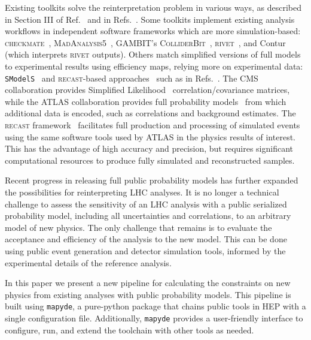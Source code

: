 \documentclass{article}
\newcommand{\mapyde}{\texttt{mapyde}}
\newcommand{\recast}{\textsc{recast}}
\begin{document}
Existing toolkits solve the reinterpretation problem in various ways, as described in Section III of Ref.~\cite{LHCReinterpretationForum:2020xtr} and in Refs.~\cite{Cranmer:2021urp,Bailey:2022tdz}.  Some toolkits implement existing analysis workflows in independent software frameworks which are more simulation-based: \textsc{checkmate}~\cite{Dercks:2016npn}, \textsc{MadAnalysis5}~\cite{Conte:2018vmg,Araz:2020lnp,Dumont:2014tja}, \textsc{GAMBIT}'s \textsc{ColliderBit}~\cite{GAMBIT:2017yxo,Kvellestad:2019vxm,GAMBIT:2018gjo,zenodo:gambit}, \textsc{rivet}~\cite{Bierlich:2019rhm,Bierlich:2020wms}, and Contur~\cite{Buckley:2021neu} (which interprets \textsc{rivet} outputs).  Others match simplified versions of full models to experimental results using efficiency maps, relying more on experimental data: \texttt{SModelS}~\cite{Alguero:2021dig} and \recast-based approaches~\cite{Cranmer:2010hk} such as in Refs.~\cite{zenodo:LHCreinterpretation,llpRepo,RECAST1,RECAST2,RECAST3}.  The CMS collaboration provides Simplified Likelihood~\cite{CMS-NOTE-2017-001} correlation/covariance matrices, while the ATLAS collaboration provides full probability models~\cite{ATL-PHYS-PUB-2019-029} from which additional data is encoded, such as correlations and background estimates. The \recast{} framework~\cite{Cranmer:2010hk} facilitates full production and processing of simulated events using the same software tools used by ATLAS in the physics results of interest.  This has the advantage of high accuracy and precision, but requires significant computational resources to produce fully simulated and reconstructed samples.

Recent progress in releasing full public probability models has further expanded the possibilities for reinterpreting LHC analyses.  It is no longer a technical challenge to assess the sensitivity of an LHC analysis with a public serialized probability model, including all uncertainties and correlations, to an arbitrary model of new physics.  The only challenge that remains is to evaluate the acceptance and efficiency of the analysis to the new model.  This can be done using public event generation and detector simulation tools, informed by the experimental details of the reference analysis.

In this paper we present a new pipeline for calculating the constraints on new physics from existing analyses with public probability models. This pipeline is built using \mapyde, a pure-python package that chains public tools in HEP with a single configuration file. Additionally, \mapyde{} provides a user-friendly interface to configure, run, and extend the toolchain with other tools as needed.
\end{document}
